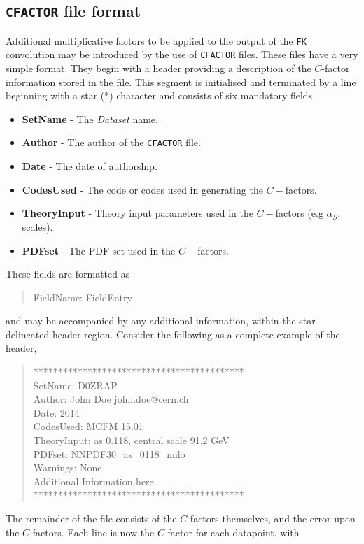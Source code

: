 \documentclass[11pt]{article}
\begin{document}
\subsection{{\tt CFACTOR} file format}
Additional multiplicative factors to be applied to the output of the {\tt FK}
convolution may be introduced by the use of {\tt CFACTOR} files. These files
have a very simple format. They begin with a header providing a description of
the $C$-factor information stored in the file. This segment is initialised and
terminated by a line beginning with a star (\mbox{*}) character and consists of
six mandatory fields
%
\begin{itemize}
\item \textbf{SetName} - The \emph{Dataset} name.
\item \textbf{Author} - The author of the {\tt CFACTOR} file.
\item \textbf{Date} - The date of authorship.
\item \textbf{CodesUsed} - The code or codes used in generating the $C-$factors.
\item \textbf{TheoryInput} - Theory input parameters used in the $C-$factors (e.g $\alpha_S$, scales).
\item \textbf{PDFset} - The PDF set used in the $C-$factors.
\end{itemize}
%
These fields are formatted as
%
\begin{quotation}
FieldName: FieldEntry
\end{quotation}
%
and may be accompanied by any additional information, within the star delineated
header region. Consider the following as a complete example of the header,
%
\begin{quotation}\noindent
*******************************************\\
SetName: D0ZRAP\\
Author: John Doe john.doe@cern.ch \\
Date: 2014\\
CodesUsed: MCFM 15.01\\
TheoryInput: as 0.118, central scale 91.2 GeV\\
PDFset: NNPDF30\_as\_0118\_nnlo\\
Warnings: None\\
Additional Information here\\
*******************************************
\end{quotation}
%
The remainder of the file consists of the $C$-factors themselves, and the error
upon the $C$-factors. Each line is now the $C$-factor for each datapoint, with
\end{document}
